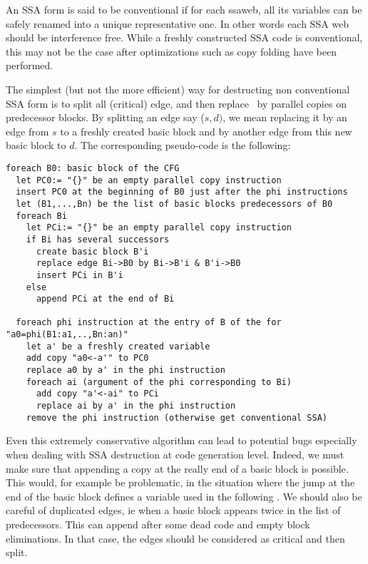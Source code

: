 An SSA form is said to be conventional if for each ssaweb, all its variables can be safely renamed into a unique representative one. In other words each SSA web should be interference free. While a freshly constructed SSA code is conventional, this may not be the case after optimizations such as copy folding have been performed.

The simplest (but not the more efficient) way for destructing non conventional SSA form is to split all (critical) edge, and then replace \phiops\ by parallel copies on predecessor blocks. By splitting an edge say ($s,d)$, we mean replacing it by an edge from $s$ to a freshly created basic block and by another edge from this new basic block to $d$. The corresponding pseudo-code is the following:

\begin{verbatim}
foreach B0: basic block of the CFG
  let PC0:= "{}" be an empty parallel copy instruction
  insert PC0 at the beginning of B0 just after the phi instructions
  let (B1,...,Bn) be the list of basic blocks predecessors of B0
  foreach Bi
    let PCi:= "{}" be an empty parallel copy instruction
    if Bi has several successors
      create basic block B'i
      replace edge Bi->B0 by Bi->B'i & B'i->B0
      insert PCi in B'i
    else
      append PCi at the end of Bi
    
  foreach phi instruction at the entry of B of the for "a0=phi(B1:a1,..,Bn:an)"
    let a' be a freshly created variable
    add copy "a0<-a'" to PC0
    replace a0 by a' in the phi instruction
    foreach ai (argument of the phi corresponding to Bi)
      add copy "a'<-ai" to PCi
      replace ai by a' in the phi instruction
    remove the phi instruction (otherwise get conventional SSA)
\end{verbatim}


Even this extremely conservative algorithm can lead to potential bugs especially when dealing with SSA destruction at code generation level. Indeed, we must make sure that appending a copy at the really end of a basic block is possible. This would, for example be problematic, in the situation where the jump at the end of the basic block defines a variable used in the following \phiop. We should also be careful of duplicated edges, ie when a basic block appears twice in the list of predecessors. This can append after some dead code and empty block eliminations. In that case, the edges should be considered as critical and then split.

